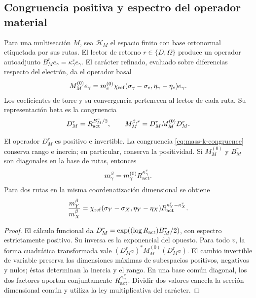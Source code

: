 \subsection{Congruencia positiva y espectro del operador material}

Para una multisección \(M\), sea \(\mathscr H_M\) el espacio finito
con base ortonormal etiquetada por sus rutas. El lector de retorno
\(r\in\{D,\Omega\}\) produce un operador autoadjunto
\(B_M^r e_\gamma=\kappa_\gamma^r e_\gamma\). El carácter refinado,
evaluado sobre diferencias respecto del electrón, da el operador basal
\[
 M_M^{(0)}e_\gamma=
 m_e^{(0)}\chi_{\rm ref}(\sigma_\gamma-\sigma_e,
                  \eta_\gamma-\eta_e)e_\gamma.
\]
Los coeficientes de torre y su convergencia pertenecen al lector de cada
ruta. Su representación beta es la congruencia
\begin{equation}
 D_M^r=R_{\rm act}^{B_M^r/2},\qquad
 M_M^{\beta,r}=D_M^rM_M^{(0)}D_M^r.
 \label{eq:mass-k-congruence}
\end{equation}

\begin{proposition}
El operador \(D_M^r\) es positivo e invertible. La congruencia
\eqref{eq:mass-k-congruence} conserva rango e inercia; en particular,
conserva la positividad. Si \(M_M^{(0)}\) y \(B_M^r\) son diagonales
en la base de rutas, entonces
\[
 m_\gamma^\beta=m_\gamma^{(0)}R_{\rm act}^{\kappa_\gamma^r}.
\]
Para dos rutas en la misma coordenatización dimensional se obtiene
\[
 \frac{m_Y^\beta}{m_X^\beta}=
 \chi_{\rm ref}(\sigma_Y-\sigma_X,\eta_Y-\eta_X)
 R_{\rm act}^{\kappa_Y^r-\kappa_X^r}.
\]
\end{proposition}
\begin{proof}
El cálculo funcional da
\(D_M^r=\exp((\log R_{\rm act})B_M^r/2)\), con espectro
estrictamente positivo. Su inversa es la exponencial del opuesto.
Para todo \(v\), la forma cuadrática transformada vale
\((D_M^rv)^*M_M^{(0)}(D_M^rv)\). El cambio invertible de variable
preserva las dimensiones máximas de subespacios positivos, negativos
y nulos; éstas determinan la inercia y el rango. En una base común
diagonal, los dos factores aportan conjuntamente
\(R_{\rm act}^{\kappa_\gamma^r}\). Dividir dos valores cancela
la sección dimensional común y utiliza la ley multiplicativa del
carácter.
\end{proof}

